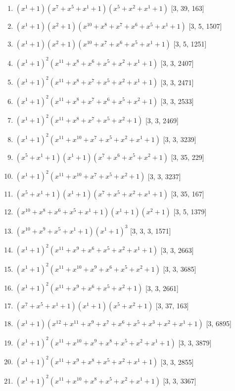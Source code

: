 \documentclass[10pt,twocolumn]{article}
\begin{document}
\begin{enumerate}
\item $(x^{1} + 1)(x^{7} + x^{5} + x^{1} + 1)(x^{5} + x^{2} + x^{1} + 1)$  [3, 39, 163]
\item $(x^{1} + 1)(x^{2} + 1)(x^{10} + x^{8} + x^{7} + x^{6} + x^{5} + x^{1} + 1)$  [3, 5, 1507]
\item $(x^{1} + 1)(x^{2} + 1)(x^{10} + x^{7} + x^{6} + x^{5} + x^{1} + 1)$  [3, 5, 1251]
\item $(x^{1} + 1)^{2}(x^{11} + x^{8} + x^{6} + x^{5} + x^{2} + x^{1} + 1)$  [3, 3, 2407]
\item $(x^{1} + 1)^{2}(x^{11} + x^{8} + x^{7} + x^{5} + x^{2} + x^{1} + 1)$  [3, 3, 2471]
\item $(x^{1} + 1)^{2}(x^{11} + x^{8} + x^{7} + x^{6} + x^{5} + x^{2} + 1)$  [3, 3, 2533]
\item $(x^{1} + 1)^{2}(x^{11} + x^{8} + x^{7} + x^{5} + x^{2} + 1)$  [3, 3, 2469]
\item $(x^{1} + 1)^{2}(x^{11} + x^{10} + x^{7} + x^{5} + x^{2} + x^{1} + 1)$  [3, 3, 3239]
\item $(x^{5} + x^{1} + 1)(x^{1} + 1)(x^{7} + x^{6} + x^{5} + x^{2} + 1)$  [3, 35, 229]
\item $(x^{1} + 1)^{2}(x^{11} + x^{10} + x^{7} + x^{5} + x^{2} + 1)$  [3, 3, 3237]
\item $(x^{5} + x^{1} + 1)(x^{1} + 1)(x^{7} + x^{5} + x^{2} + x^{1} + 1)$  [3, 35, 167]
\item $(x^{10} + x^{8} + x^{6} + x^{5} + x^{1} + 1)(x^{1} + 1)(x^{2} + 1)$  [3, 5, 1379]
\item $(x^{10} + x^{9} + x^{5} + x^{1} + 1)(x^{1} + 1)^{3}$  [3, 3, 3, 1571]
\item $(x^{1} + 1)^{2}(x^{11} + x^{9} + x^{6} + x^{5} + x^{2} + x^{1} + 1)$  [3, 3, 2663]
\item $(x^{1} + 1)^{2}(x^{11} + x^{10} + x^{9} + x^{6} + x^{5} + x^{2} + 1)$  [3, 3, 3685]
\item $(x^{1} + 1)^{2}(x^{11} + x^{9} + x^{6} + x^{5} + x^{2} + 1)$  [3, 3, 2661]
\item $(x^{7} + x^{5} + x^{1} + 1)(x^{1} + 1)(x^{5} + x^{2} + 1)$  [3, 37, 163]
\item $(x^{1} + 1)(x^{12} + x^{11} + x^{9} + x^{7} + x^{6} + x^{5} + x^{3} + x^{2} + x^{1} + 1)$  [3, 6895]
\item $(x^{1} + 1)^{2}(x^{11} + x^{10} + x^{9} + x^{8} + x^{5} + x^{2} + x^{1} + 1)$  [3, 3, 3879]
\item $(x^{1} + 1)^{2}(x^{11} + x^{9} + x^{8} + x^{5} + x^{2} + x^{1} + 1)$  [3, 3, 2855]
\item $(x^{1} + 1)^{2}(x^{11} + x^{10} + x^{8} + x^{5} + x^{2} + x^{1} + 1)$  [3, 3, 3367]

\end{enumerate}
\end{document}
